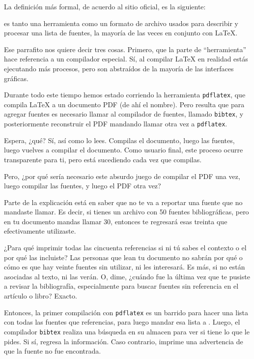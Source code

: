 La definición más formal, de acuerdo al sitio oficial, es la siguiente:

\begin{displayquote}
\BibTeX{} es tanto una herramienta como un formato de archivo usados para describir y procesar una lista de fuentes, la mayoría de las veces en conjunto con \LaTeX{}.
\end{displayquote}

Ese parrafito nos quiere decir tres cosas. Primero, que la parte de ``herramienta'' hace referencia a un compilador especial. Sí, al compilar \LaTeX{} en realidad estás ejecutando más procesos, pero son abstraídos de la mayoría de las interfaces gráficas.

Durante todo este tiempo hemos estado corriendo la herramienta \texttt{pdflatex}, que compila \LaTeX{} a un documento PDF (de ahí el nombre). Pero resulta que para agregar fuentes es necesario llamar al compilador de fuentes, llamado \texttt{bibtex}, y posteriormente reconstruir el PDF mandando llamar otra vez a \texttt{pdflatex}.

Espera, ¿qué? Sí, así como lo lees. Compilas el documento, luego las fuentes, luego vuelves a compilar el documento. Como usuario final, este proceso ocurre transparente para ti, pero está sucediendo cada vez que compilas.

Pero, ¿por qué sería necesario este absurdo juego de compilar el PDF una vez, luego compilar las fuentes, y luego el PDF otra vez?

Parte de la explicación está en saber que \BibTeX{} no te va a reportar una fuente que no mandaste llamar. Es decir, si tienes un archivo con 50 fuentes bibliográficas, pero en tu documento mandas llamar 30, entonces te regresará esas treinta que efectivamente utilizaste.

¿Para qué imprimir todas las cincuenta referencias si ni tú sabes el contexto o el por qué las incluiste? Las personas que lean tu documento no sabrán por qué o cómo es que hay veinte fuentes sin utilizar, ni les interesará. Es más, si no están asociadas al texto, ni las verán. O, dime, ¿cuándo fue la última vez que te pusiste a revisar la bibliografía, especialmente para buscar fuentes sin referencia en el artículo o libro? Exacto.

Entonces, la primer compilación con \texttt{pdflatex} es un barrido para hacer una lista con todas las fuentes que referencias, para luego mandar esa lista a \BibTeX. Luego, el compilador \texttt{bibtex} realiza una búsqueda en su almacen para ver si tiene lo que le pides. Si sí, regresa la información. Caso contrario, imprime una advertencia de que la fuente no fue encontrada.

